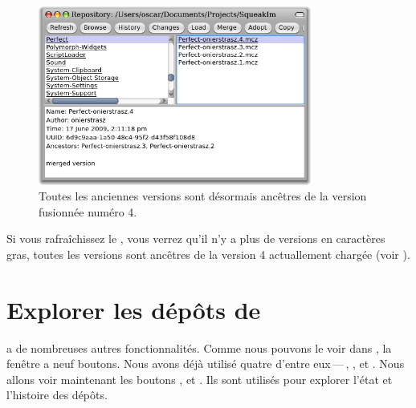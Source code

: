 \documentclass[a4paper,10pt,twoside]{book}
\begin{document}


\begin{figure}[ht]\centering
	\includegraphics[width=0.8\textwidth]{merged}
	\caption{Toutes les anciennes versions sont désormais ancêtres de
      la version fusionnée numéro 4.
	}
\end{figure}

Si vous rafraîchissez le \RI, vous verrez qu'il n'y a plus de versions
en caractères gras, \ie{} toutes les versions sont ancêtres de la
version 4 actuallement chargée (voir ).

\section{Explorer les dépôts de \MC}%

\MC a de nombreuses autres fonctionnalités. Comme nous pouvons le voir
dans  , 
la fenêtre \MCB a neuf boutons. 
Nous avons déjà utilisé quatre d'entre eux\,---\,,
,  et .
Nous allons voir maintenant les boutons
,  et . Ils sont
utilisés pour explorer l'état et l'histoire des dépôts.

\end{document}
